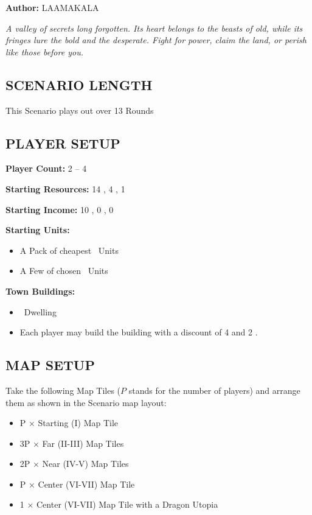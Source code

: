
\begin{multicols*}{2}

\textbf{Author:} LAAMAKALA

\textit{A valley of secrets long forgotten. Its heart belongs to the beasts of old, while its fringes lure the bold and the desperate. Fight for power, claim the land, or perish like those before you.}

\subsection*{\MakeUppercase{Scenario Length}}
This Scenario plays out over 13 Rounds

\subsection*{\MakeUppercase{Player Setup}}
\textbf{Player Count:} 2 -- 4

\textbf{Starting Resources:} 14 , 4 , 1 

\textbf{Starting Income:} 10 , 0 , 0 

\textbf{Starting Units:}

\begin{itemize}
  \item A Pack of cheapest \bronze\ Units
  \item A Few  of chosen \bronze\ Units
\end{itemize}

\textbf{Town Buildings:}
\begin{itemize}
  \item \bronze\ Dwelling
  \item Each player may build the  building with a discount of 4  and 2 .
\end{itemize}

\subsection*{\MakeUppercase{Map Setup}}
Take the following Map Tiles ($P$ stands for the number of players) and arrange them as shown in the Scenario map layout:

\begin{itemize}
  \item P × Starting (I) Map Tile
  \item 3P × Far (II-III) Map Tiles
  \item 2P × Near (IV-V) Map Tiles
  \item P × Center (VI-VII) Map Tile
  \item 1 × Center (VI-VII) Map Tile with a Dragon Utopia
\end{itemize}


\end{multicols*}
